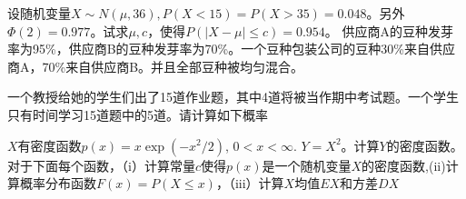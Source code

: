 \documentclass[10pt,addpoints,portrait]{exam}
\begin{document}
		\begin{questions} %
			\question[8]
			设随机变量$X\sim N(\mu, 36), P(X < 15) = P(X > 35) = 0.048$。另外$\Phi(2) = 0.977$。试求$\mu, c$，使得$P(|X - \mu| \leq c) = 0.954$。
			\vspace{2cm}
			\question
			供应商A的豆种发芽率为95\%，供应商B的豆种发芽率为70\%。一个豆种包装公司的豆种30\%来自供应商A，70\%来自供应商B。并且全部豆种被均匀混合。
			
			\question
			一个教授给她的学生们出了15道作业题，其中4道将被当作期中考试题。一个学生只有时间学习15道题中的5道。请计算如下概率
			\question[10]
			$X$有密度函数$p(x) = x\exp(-x ^ 2 / 2)$, $0 < x < \infty$. $Y = X ^ 2$。计算$Y$的密度函数。\\
			\vspace{3cm}
			\question
			对于下面每个函数，（i）计算常量$c$使得$p(x)$是一个随机变量$X$的密度函数,(ii)计算概率分布函数$F(x) = P(X \leq x)$，（iii）计算$X$均值$EX$和方差$DX$
\end{questions}
\end{document}
